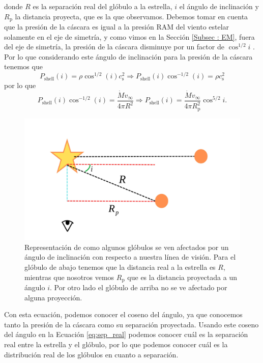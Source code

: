 \documentclass{book}
\begin{document}
\noindent donde $R$ es la separación real del glóbulo a la estrella, $i$ el ángulo de inclinación y $R_\mathrm{p}$ la distancia proyecta, que es la que observamos. Debemos tomar en cuenta que la presión de la cáscara es igual a la presión RAM del viento estelar solamente en el eje de simetría, y como vimos en la Sección \ref{Subsec : EM}, fuera del eje de simetría, la presión de la cáscara disminuye por un factor de $\cos^{1/2}i$ \citep{Tarango:2018}. Por lo que considerando este ángulo de inclinación para la presión de la cáscara tenemos que
\begin{equation}
    P_\mathrm{shell}(i)=\rho\cos^{1/2}(i) c_\mathrm{s}^2 \Rightarrow P_\mathrm{shell}(i)\cos^{-1/2}(i)=\rho c_\mathrm{s}^2 
\end{equation}
por lo que  
\begin{equation}
P_\mathrm{shell}(i)\cos^{-1/2}(i)=\frac{\dot{M}v_\infty}{4\pi R^2} \Rightarrow
P_\mathrm{shell}(i)=\frac{\dot{M}v_\infty}{4\pi R_\mathrm{p}^2}\cos^{5/2}i.
\end{equation}\label{eq:cos 5_2}

\begin{figure}[htb]
    \centering
    \includegraphics[width=\textwidth]{artesanales/ImgFi01-6.pdf}
    \caption{Representación de como algunos glóbulos se ven afectados por un ángulo de inclinación con respecto a nuestra línea de visión. Para el glóbulo de abajo tenemos que la distancia real a la estrella es $R$, mientras que nosotros vemos $R_\mathrm{p}$ que es la distancia proyectada a un ángulo $i$. Por otro lado el glóbulo de arriba no se ve afectado por alguna proyección.}
    \label{Ang proyeccion}
\end{figure}

Con esta ecuación, podemos conocer el coseno del ángulo, ya que conocemos tanto la presión de la cáscara como su separación proyectada. Usando este coseno del ángulo en la Ecuación \ref{eq:sep_real} podemos conocer cuál es la separación real entre la estrella y el glóbulo, por lo que podemos conocer cuál es la distribución real de los glóbulos en cuanto a separación.  
\end{document}
